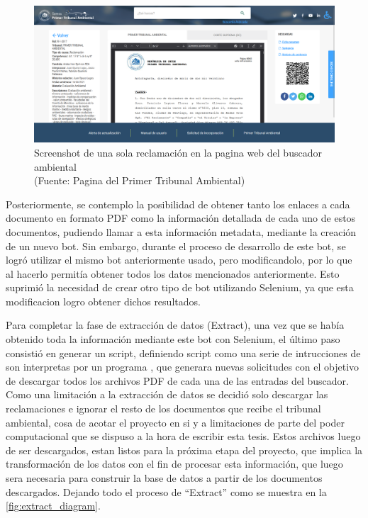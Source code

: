 \begin{figure}[ht!]
    \centering
    \includegraphics[width=.75\textwidth]{figures/huemul3.png}
    \caption[Screenshot de una sola reclamación en la pagina web del buscador ambiental]{Screenshot de una sola reclamación en la pagina web del buscador ambiental\\
    {\scriptsize (Fuente: Pagina del Primer Tribunal Ambiental)}}
    \label{fig:extract2}
\end{figure}

\newpage

Posteriormente, se contemplo la posibilidad de obtener tanto los enlaces a cada documento en formato PDF como la información 
detallada de cada uno de estos documentos, pudiendo llamar a esta información metadata, mediante la creación de un nuevo bot. 
Sin embargo, durante el proceso de desarrollo de este bot, se logró utilizar el mismo bot anteriormente usado, pero modificandolo,
por lo que al hacerlo permitía obtener todos los datos mencionados anteriormente. Esto suprimió 
la necesidad de crear otro tipo de bot utilizando Selenium, ya que esta modificacion logro obtener dichos resultados.

Para completar la fase de extracción de datos (Extract), una vez que se había obtenido toda la información mediante este bot con Selenium, 
el último paso consistió en generar un script, definiendo script como una serie de intrucciones de son interpretas por un programa \cite{techtargetWhatScript}, que generara nuevas solicitudes con el objetivo de descargar todos los archivos PDF de cada una 
de las entradas del buscador. 
Como una limitación a la extracción de datos se decidió solo descargar las reclamaciones e ignorar el resto de los documentos que recibe el tribunal ambiental, cosa de acotar el proyecto en si y a limitaciones de parte del poder computacional que se dispuso a la hora de escribir esta tesis.
Estos archivos luego de ser descargados, estan listos para la próxima etapa del proyecto, que implica la transformación 
de los datos con el fin de procesar esta información, que luego sera necesaria para construir la base de datos a partir de los documentos descargados.
Dejando todo el proceso de ``Extract'' como se muestra en la \autoref{fig:extract_diagram}. 

